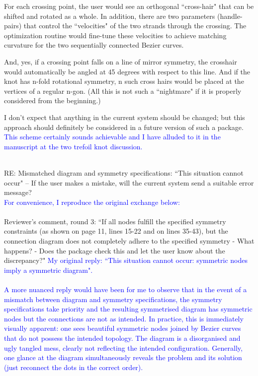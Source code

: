\documentclass[12pt]{article}
\begin{document}
For each crossing point, the user would see an orthogonal ``cross-hair"
that can be shifted and rotated as a whole.  In addition, there are
two parameters (handle-pairs) that control the ``velocities" of the two
strands through the crossing.  The optimization routine would
fine-tune these velocities to achieve matching curvature for the two
sequentially connected Bezier curves.

And, yes, if a crossing point falls on a line of mirror symmetry, the
crosshair would automatically be angled at 45 degrees with respect to
this line.  And if the knot has n-fold rotational symmetry, n such
cross hairs would be placed at the vertices of a regular n-gon.  (All
this is not such a ``nightmare" if it is properly considered from the
beginning.)

I don't expect that anything in the current system should be changed;
but this approach should definitely be considered in a future version
of such a package.
\textcolor{blue}{\\ This scheme certainly sounds achievable and I have
  alluded to it in the manuscript at the two trefoil knot
  discussion.\\ \\}


RE: Mismatched diagram and symmetry specifications: ``This situation
cannot occur" -- If the user makes a mistake, will the current system
send a suitable error message?\textcolor{blue}{\\For convenience, I
  reproduce the original exchange below:\\ \\} {\tiny Reviewer's
  comment, round 3: ``If all nodes fulfill the specified symmetry
  constraints (as shown on page 11, lines 15-22 and on lines 35-43),
  but the connection diagram does not completely adhere to the
  specified symmetry - What happens? - Does the package check this and
  let the user know about the discrepancy?"}  \textcolor{blue}{\tiny
  My original reply: ``This situation cannot occur: symmetric nodes
  imply a symmetric diagram".\\ \\} \textcolor{blue}{A more nuanced
  reply would have been for me to observe that in the event of a
  mismatch between diagram and symmetry specifications, the symmetry
  specifications take priority and the resulting symmetrised diagram
  has symmetric nodes but the connections are not as intended.  In
  practice, this is immediately visually apparent: one sees beautiful
  symmetric nodes joined by Bezier curves that do not possess the
  intended topology.  The diagram is a disorganised and ugly tangled
  mess, clearly not reflecting the intended configuration.  Generally,
  one glance at the diagram simultaneously reveals the problem and its
  solution (just reconnect the dots in the correct order).\\ \\}
\end{document}
